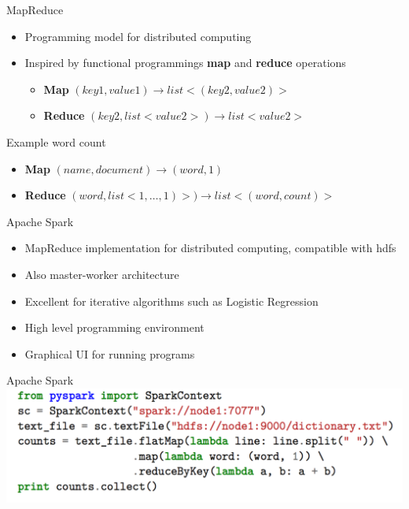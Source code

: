 \begin{frame}{MapReduce}
    \begin{itemize}
        \item Programming model for distributed computing
        \item Inspired by functional programmings \textbf{map} and \textbf{reduce} operations
        \begin{itemize}
            \item \textbf{Map} $(key1, value1) \rightarrow list<(key2, value2)>$
            \item \textbf{Reduce} $(key2, list<value2>) \rightarrow list<value2>$
        \end{itemize}
    \end{itemize}
    Example word count
    \begin{itemize}
        \item \textbf{Map} $(name, document) \rightarrow (word, 1)$
        \item \textbf{Reduce} $(word, list<1,\dots,1)>) \rightarrow list<(word,count)>$
    \end{itemize}
\end{frame}

\begin{frame}{Apache Spark}
    \begin{itemize}
        \item MapReduce implementation for distributed computing, compatible with hdfs
        \item Also master-worker architecture
        \item Excellent for iterative algorithms such as Logistic Regression
        \item High level programming environment
        \item Graphical UI for running programs
    \end{itemize}

\end{frame}
\begin{frame}{Apache Spark}
        \centering \includegraphics[scale=0.55]{bigdataandcluster/code.png}
\end{frame}


